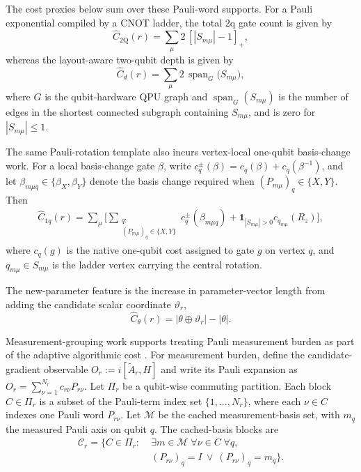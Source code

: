 \documentclass[
  reprint,
  amsmath,
  amssymb,
  aps,
  pra,
  nofootinbib,
  superscriptaddress,
  floatfix
]{revtex4-2}
\newcommand{\twq}{\mathrm{2Q}}
\begin{document}
The cost proxies below sum over these Pauli-word supports. For a Pauli exponential compiled by a CNOT ladder, the total 2q gate count is given by
\begin{equation}
\widehat C_{\twq}(r)=\sum_{\mu}2\,[|S_{m\mu}|-1]_+,
\label{eq:pauli_2count_proxy}
\end{equation}
whereas the layout-aware two-qubit depth is given by
\begin{equation}
\widehat C_d(r)=\sum_{\mu}2\,\operatorname{span}_{G}
\bigl(S_{m\mu}\bigr),
\label{eq:pauli_2depth_proxy}
\end{equation}
where $G$ is the qubit-hardware QPU graph and $\operatorname{span}_{G}(S_{m \mu})$ is the number of edges in the shortest connected subgraph containing $S_{m \mu}$, and is zero for $|S_{m \mu}|\le1$.

The same Pauli-rotation template also incurs vertex-local one-qubit basis-change work. For a local basis-change gate $\beta$, write \(c_q^{\pm}(\beta)=c_q(\beta)+c_q(\beta^{-1})\), and let \(\beta_{m\mu q}\in\{\beta_X,\beta_Y\}\) denote the basis change required when \((P_{m\mu})_q\in\{X,Y\}\). Then
\begin{equation}
\begin{aligned}
\widehat C_{1q}(r)
=
\sum_{\mu}
\Bigg[
\sum_{\substack{q:\\(P_{m\mu})_q\in\{X,Y\}}}
c_q^{\pm}(\beta_{m\mu q})
+
\mathbf 1_{|S_{m\mu}|>0}c_{q_{m\mu}}(R_z)
\Bigg],
\end{aligned}
\label{eq:pauli_1count_proxy}
\end{equation}
where $c_q(g)$ is the native one-qubit cost assigned to gate $g$ on vertex $q$, and $q_{m\mu}\in S_{m\mu}$ is the ladder vertex carrying the central rotation.

The new-parameter feature is the increase in parameter-vector length from adding the candidate scalar coordinate $\vartheta_r$,
\begin{equation}
\widehat C_\theta(r)
=
|\theta\oplus\vartheta_r|-|\theta|.
\label{eq:parameter_cost_proxy}
\end{equation}


Measurement-grouping work supports treating Pauli measurement burden as part of the adaptive algorithmic cost \cite{Verteletskyi2020CliqueCover,Yen2020CompatibleMeasurements}. For measurement burden, define the candidate-gradient observable \(O_r:=i[\widetilde A_r,H]\) and write its Pauli expansion as \(O_r=\sum_{\nu=1}^{N_r}c_{r\nu}P_{r\nu}\). Let \(\Pi_r\) be a qubit-wise commuting partition. Each block \(C\in\Pi_r\) is a subset of the Pauli-term index set \(\{1,\ldots,N_r\}\), where each \(\nu\in C\) indexes one Pauli word \(P_{r\nu}\). Let \(\mathcal M\) be the cached measurement-basis set, with \(m_q\) the measured Pauli axis on qubit \(q\). The cached-basis blocks are
\begin{equation}
\begin{aligned}
\mathcal C_r
=
\{C\in\Pi_r:\;&
\exists m\in\mathcal M\;
\forall \nu\in C\;
\forall q,\\
&
(P_{r\nu})_q=I
\ \lor\
(P_{r\nu})_q=m_q
\}.
\end{aligned}
\label{eq:cached_measurement_blocks}
\end{equation}
\end{document}
